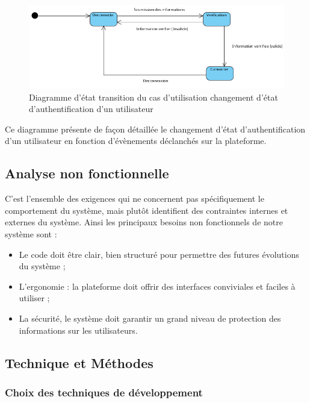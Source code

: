 \begin{itemize}
	      \begin{figure}[H]
		      \centering
		      \includegraphics[width=1\textwidth]{img/etu}
		      \caption{Diagramme d’état transition du cas d'utilisation changement d’état d'authentification d’un utilisateur}
		      \label{fig:mesh1}
	      \end{figure}

	      Ce diagramme présente de façon détaillée le changement d’état d’authentification d’un utilisateur en fonction d’évènements déclanchés sur la plateforme.
\end{itemize}

\subsection{Analyse non fonctionnelle} %

C’est l’ensemble des exigences qui ne concernent pas spécifiquement le comportement du système, mais plutôt identifient des contraintes internes et externes du système. Ainsi les principaux besoins non fonctionnels de notre système sont :

\begin{itemize}
	\item Le code doit être clair, bien structuré pour permettre des futures évolutions du système ;
	\item L’ergonomie : la plateforme doit offrir des interfaces conviviales et faciles à utiliser ;
	\item La sécurité, le système doit garantir un grand niveau de protection des informations sur les utilisateurs.
\end{itemize}

\subsection{Technique et Méthodes} %

\subsubsection{Choix des techniques de développement}

